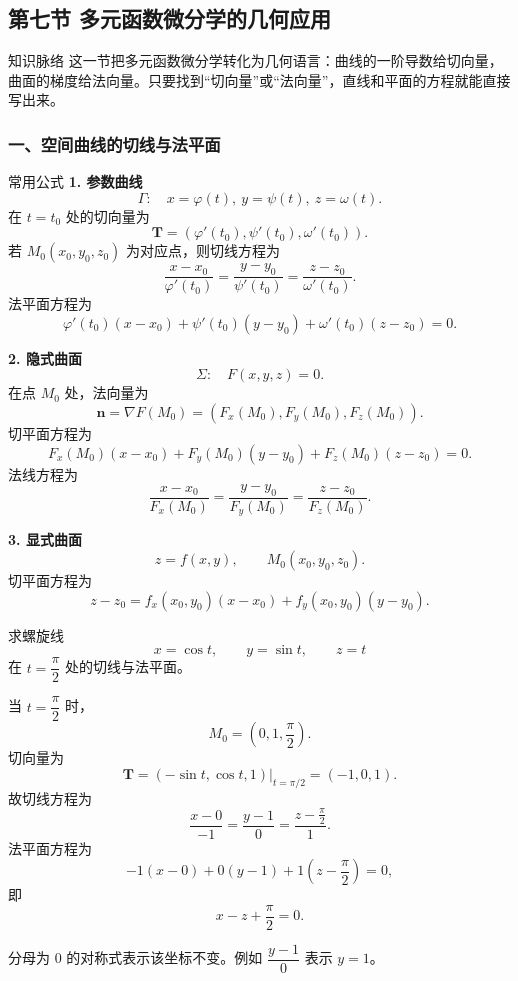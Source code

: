 \subsection{第七节 多元函数微分学的几何应用}

\begin{summarybox}{知识脉络}
这一节把多元函数微分学转化为几何语言：曲线的一阶导数给切向量，曲面的梯度给法向量。只要找到“切向量”或“法向量”，直线和平面的方程就能直接写出来。
\end{summarybox}

\subsubsection*{一、空间曲线的切线与法平面}

\begin{methodbox}{常用公式}
\textbf{1. 参数曲线}
\[
  \Gamma:\quad x=\varphi(t),\ y=\psi(t),\ z=\omega(t).
\]
在 $t=t_0$ 处的切向量为
\[
  \bm T=\left(\varphi'(t_0),\psi'(t_0),\omega'(t_0)\right).
\]
若 $M_0(x_0,y_0,z_0)$ 为对应点，则切线方程为
\[
  \frac{x-x_0}{\varphi'(t_0)}
  =\frac{y-y_0}{\psi'(t_0)}
  =\frac{z-z_0}{\omega'(t_0)}.
\]
法平面方程为
\[
  \varphi'(t_0)(x-x_0)+\psi'(t_0)(y-y_0)+\omega'(t_0)(z-z_0)=0.
\]

\textbf{2. 隐式曲面}
\[
  \Sigma:\quad F(x,y,z)=0.
\]
在点 $M_0$ 处，法向量为
\[
  \bm n=\nabla F(M_0)=\left(F_x(M_0),F_y(M_0),F_z(M_0)\right).
\]
切平面方程为
\[
  F_x(M_0)(x-x_0)+F_y(M_0)(y-y_0)+F_z(M_0)(z-z_0)=0.
\]
法线方程为
\[
  \frac{x-x_0}{F_x(M_0)}
  =\frac{y-y_0}{F_y(M_0)}
  =\frac{z-z_0}{F_z(M_0)}.
\]

\textbf{3. 显式曲面}
\[
  z=f(x,y),\qquad M_0(x_0,y_0,z_0).
\]
切平面方程为
\[
  z-z_0=f_x(x_0,y_0)(x-x_0)+f_y(x_0,y_0)(y-y_0).
\]
\end{methodbox}

\begin{problem}
求螺旋线
\[
  x=\cos t,\qquad y=\sin t,\qquad z=t
\]
在 $t=\dfrac{\pi}{2}$ 处的切线与法平面。
\end{problem}
\begin{solution}
当 $t=\dfrac{\pi}{2}$ 时，
\[
  M_0=\left(0,1,\frac{\pi}{2}\right).
\]
切向量为
\[
  \bm T=\left(-\sin t,\cos t,1\right)\Big|_{t=\pi/2}=(-1,0,1).
\]
故切线方程为
\[
  \frac{x-0}{-1}=\frac{y-1}{0}=
  \frac{z-\frac{\pi}{2}}{1}.
\]
法平面方程为
\[
  -1(x-0)+0(y-1)+1\left(z-\frac{\pi}{2}\right)=0,
\]
即
\[
  x-z+\frac{\pi}{2}=0.
\]
\end{solution}
\begin{note}
分母为 $0$ 的对称式表示该坐标不变。例如 $\dfrac{y-1}{0}$ 表示 $y=1$。
\end{note}

